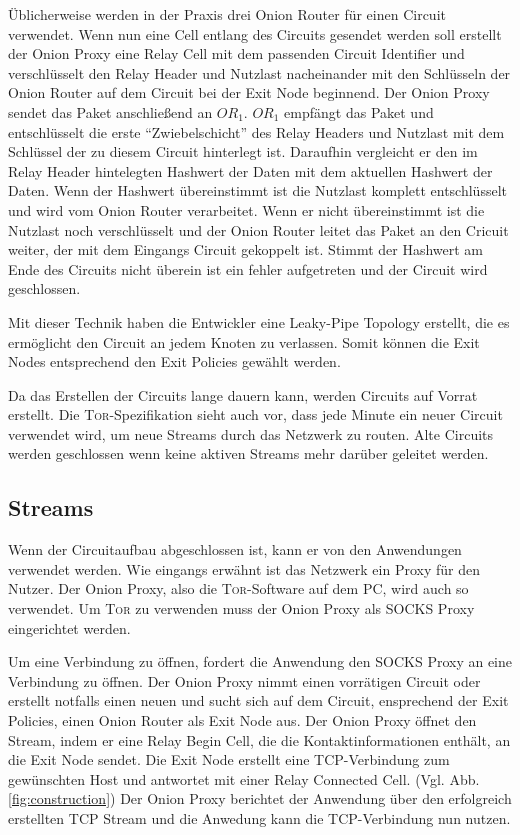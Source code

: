 \documentclass[fleqn,envcountsame,runningheads,10pt,a4paper]{llncs}
\begin{document}
Üblicherweise werden in der Praxis drei Onion Router für einen Circuit verwendet. Wenn nun eine Cell entlang des Circuits gesendet werden soll erstellt der Onion Proxy eine Relay Cell mit dem passenden Circuit Identifier und verschlüsselt den Relay Header und Nutzlast nacheinander mit den Schlüsseln der Onion Router auf dem Circuit bei der Exit Node beginnend. Der Onion Proxy sendet das Paket anschließend an $\textit{OR}_1$. $\textit{OR}_1$ empfängt das Paket und entschlüsselt die erste ``Zwiebelschicht'' des Relay Headers und Nutzlast mit dem Schlüssel der zu diesem Circuit hinterlegt ist. Daraufhin vergleicht er den im Relay Header hintelegten Hashwert der Daten mit dem aktuellen Hashwert der Daten. Wenn der Hashwert übereinstimmt ist die Nutzlast komplett entschlüsselt und wird vom Onion Router verarbeitet. Wenn er nicht übereinstimmt ist die Nutzlast noch verschlüsselt und der Onion Router leitet das Paket an den Cricuit weiter, der mit dem Eingangs Circuit gekoppelt ist. Stimmt der Hashwert am Ende des Circuits nicht überein ist ein fehler aufgetreten und der Circuit wird geschlossen.

Mit dieser Technik haben die Entwickler eine Leaky-Pipe Topology erstellt, die es ermöglicht den Circuit an jedem Knoten zu verlassen. Somit können die Exit Nodes entsprechend den Exit Policies gewählt werden.

Da das Erstellen der Circuits lange dauern kann, werden Circuits auf Vorrat erstellt. Die \textsc{Tor}-Spezifikation sieht auch vor, dass jede Minute ein neuer Circuit verwendet wird, um neue Streams durch das Netzwerk zu routen. Alte Circuits werden geschlossen wenn keine aktiven Streams mehr darüber geleitet werden.
   
\subsection{Streams}

Wenn der Circuitaufbau abgeschlossen ist, kann er von den Anwendungen verwendet werden. Wie eingangs erwähnt ist das Netzwerk ein Proxy für den Nutzer. Der Onion Proxy, also die \textsc{Tor}-Software auf dem PC, wird auch so verwendet. Um \textsc{Tor} zu verwenden muss der Onion Proxy als SOCKS Proxy \cite{rfc:socks} eingerichtet werden.

Um eine Verbindung zu öffnen, fordert die Anwendung den SOCKS Proxy an eine Verbindung zu öffnen. Der Onion Proxy nimmt einen vorrätigen Circuit oder erstellt notfalls einen neuen und sucht sich auf dem Circuit, ensprechend der Exit Policies, einen Onion Router als Exit Node aus. Der Onion Proxy öffnet den Stream, indem er eine Relay Begin Cell, die die Kontaktinformationen enthält, an die Exit Node sendet. Die Exit Node erstellt eine TCP-Verbindung zum gewünschten Host und antwortet mit einer Relay Connected Cell. (Vgl. Abb. \ref{fig:construction}) Der Onion Proxy berichtet der Anwendung über den erfolgreich erstellten TCP Stream und die Anwedung kann die TCP-Verbindung nun nutzen.
\end{document}
